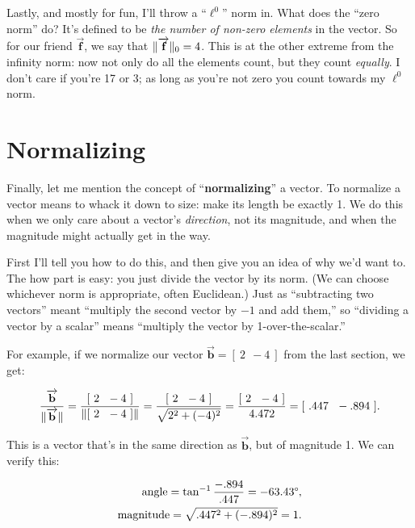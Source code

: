 Lastly, and mostly for fun, I'll throw a ``$\ell^0$'' norm in. What does the
``zero norm'' do? It's defined to be \textit{the number of non-zero elements}
in the vector. So for our friend $\overrightarrow{\textbf{f}}$, we say that
$\lVert\overrightarrow{\textbf{f}}\rVert_0 = 4$. This is at the other extreme from the
infinity norm: now not only do all the elements count, but they count
\textit{equally}. I don't care if you're 17 or 3; as long as you're not zero
you count towards my $\ell^0$ norm.

\section{Normalizing}


Finally, let me mention the concept of ``\textbf{normalizing}'' a vector. To
normalize a vector means to whack it down to size: make its length be exactly
1. We do this when we only care about a vector's \textit{direction}, not its
magnitude, and when the magnitude might actually get in the way.

First I'll tell you how to do this, and then give you an idea of why we'd want
to. The how part is easy: you just divide the vector by its norm. (We can
choose whichever norm is appropriate, often Euclidean.) Just as ``subtracting
two vectors'' meant ``multiply the second vector by $-1$ and add them,'' so
``dividing a vector by a scalar'' means ``multiply the vector by
1-over-the-scalar.''

For example, if we normalize our vector $\overrightarrow{\textbf{b}} = [\ 2\ \
-4\ ]$ from the last section, we get:

\vspace{-.15in}
\begin{align*}
\frac{\overrightarrow{\textbf{b}}}{\lVert\overrightarrow{\textbf{b}}\rVert} =
\frac{[\ 2\ \ -4\ ]}{\lVert[\ 2\ \ -4\ ]\rVert} =
\frac{[\ 2\ \ -4\ ]}{\sqrt{2^2 + (-4)^2}} =
\frac{[\ 2\ \ -4\ ]}{4.472} = [\ .447 \ \ -.894\ ].
\end{align*}

This is a vector that's in the same direction as $\overrightarrow{\textbf{b}}$,
but of magnitude 1. We can verify this:

\vspace{-.15in}
\begin{align*}
\textrm{angle} = \tan^{-1} \frac{-.894}{.447} = -63.43\degree, \\
\textrm{magnitude} = \sqrt{.447^2 + (-.894)^2} = 1.
\end{align*}


